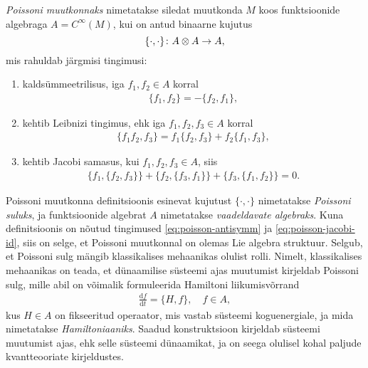 \begin{dfn}
    \emph{Poissoni muutkonnaks} nimetatakse siledat muutkonda $M$ koos
    funktsioonide algebraga $A = C^\infty(M)$, kui on antud binaarne
    kujutus
    \[ \{\cdot, \cdot\} \colon A \otimes A \to A, \]
    mis rahuldab järgmisi tingimusi:
    \begin{enumerate}
      \item kaldsümmeetrilisus, iga $f_1, f_2 \in A$ korral
          \begin{align}\label{eq:poisson-antisymm}
              \{f_1, f_2\} = -\{f_2, f_1\},
          \end{align}
      \item kehtib Leibnizi tingimus, ehk iga $f_1, f_2, f_3 \in A$ korral
          \begin{align}
              \{f_1 f_2, f_3\} = f_1 \{f_2, f_3\} + f_2 \{f_1, f_3\},
          \end{align}
      \item kehtib Jacobi samasus, kui $f_1, f_2, f_3 \in A$, siis
          \begin{align}\label{eq:poisson-jacobi-id}
              \{f_1, \{f_2, f_3\}\} + \{f_2, \{f_3, f_1\}\} +
              \{f_3, \{f_1, f_2\}\} = 0.
          \end{align}
    \end{enumerate}
\end{dfn}

Poissoni muutkonna definitsioonis esinevat kujutust $\{\cdot, \cdot\}$
nimetatakse \emph{Poissoni suluks}, ja funktsioonide algebrat $A$ nimetatakse
\emph{vaadeldavate algebraks}. Kuna definitsioonis on nõutud tingimused
\eqref{eq:poisson-antisymm} ja \eqref{eq:poisson-jacobi-id}, siis on selge,
et Poissoni muutkonnal on olemas Lie algebra struktuur.
Selgub, et Poissoni sulg mängib klassikalises mehaanikas olulist rolli.
Nimelt, klassikalises mehaanikas on teada, et dünaamilise süsteemi ajas
muutumist kirjeldab Poissoni sulg, mille abil on võimalik formuleerida
Hamiltoni liikumisvõrrand
\begin{align}\label{eq:hamilton-equation}
    \frac{\mathrm{d} f}{\mathrm{d} t} = \{H, f\}, \quad f \in A,
\end{align}
kus $H \in A$ on fikseeritud operaator, mis vastab süsteemi koguenergiale,
ja mida nimetatakse \emph{Hamiltoniaaniks}. Saadud konstruktsioon
kirjeldab süsteemi muutumist ajas, ehk selle süsteemi dünaamikat, ja on
seega olulisel kohal paljude kvantteooriate kirjeldustes.

